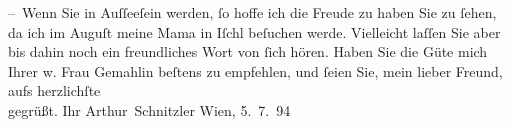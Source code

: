 \pstart
           – Wenn Sie in Auſſeeſein werden,{ }ſo hoffe ich
               die Freude zu haben Sie zu{ }ſehen, da ich im Auguſt meine Mama in Iſchl beſuchen werde. Vielleicht laſſen Sie aber bis dahin noch ein
               freundliches Wort von{ }ſich hören. Haben Sie die Güte mich Ihrer w. Frau Gemahlin beſtens zu empfehlen,
               und{ }ſeien Sie, mein {\pb}lieber Freund, aufs herzlichſte{\\}gegrüßt.\pend
           \pstart Ihr
                  \spacefill\mbox{Arthur Schnitzler}\pend{}
\pstart
           Wien, 5. 7. 94\pend
           \endnumbering{}  \newcommand{\dateiname}{L03908}\newcommand{\titel}{Arthur Schnitzler an Theodor Herzl, 5. 7. 1894}\newcommand{\editorInnen}{Herausgegeben von Jahnke, SelmaMüller, Martin Anton}
